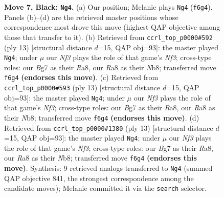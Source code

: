 \documentclass[11pt]{article}
\begin{document}
\begin{figure}[p]
\caption{\textbf{Move 7, Black: \texttt{Ng4}.} (a) Our position; Melanie plays \texttt{Ng4} (\texttt{f6g4}). Panels (b)--(d) are the retrieved master positions whose correspondence most drove this move (highest QAP objective among those that transfer to it). (b) Retrieved from \texttt{ccrl\_top\_p0000\#592} (ply 13) [structural distance $d$=15, QAP obj=93]: the master played \texttt{Ng4}; under $\mu$ our \emph{Nf3} plays the role of that game's \emph{Nf3}; cross-type roles: our \emph{B}g7 as their \emph{R}a8, our \emph{R}a8 as their \emph{N}b8; transferred move \texttt{f6g4} \textbf{(endorses this move)}. (c) Retrieved from \texttt{ccrl\_top\_p0000\#593} (ply 13) [structural distance $d$=15, QAP obj=93]: the master played \texttt{Ng4}; under $\mu$ our \emph{Nf3} plays the role of that game's \emph{Nf3}; cross-type roles: our \emph{B}g7 as their \emph{R}a8, our \emph{R}a8 as their \emph{N}b8; transferred move \texttt{f6g4} \textbf{(endorses this move)}. (d) Retrieved from \texttt{ccrl\_top\_p0000\#1380} (ply 13) [structural distance $d$=15, QAP obj=93]: the master played \texttt{Ng4}; under $\mu$ our \emph{Nf3} plays the role of that game's \emph{Nf3}; cross-type roles: our \emph{B}g7 as their \emph{R}a8, our \emph{R}a8 as their \emph{N}b8; transferred move \texttt{f6g4} \textbf{(endorses this move)}. Synthesis: 9 retrieved analogs transferred to \texttt{Ng4} (summed QAP objective 841, the strongest correspondence among the candidate moves); Melanie committed it via the \texttt{search} selector.}
\label{fig:thought-m13}
\end{figure}

\clearpage
\end{document}
